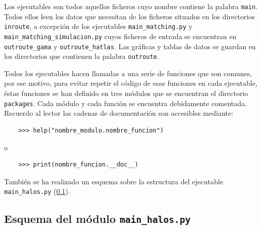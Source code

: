 \hspace{3mm}

Los ejecutables son todos aquellos ficheros cuyo nombre contiene la palabra \texttt{main}. Todos ellos leen los datos que necesitan de los ficheros situados en los directorios \texttt{inroute}, a excepción de los ejecutables \texttt{main\_matching.py} y \texttt{main\_matching\_simulacion.py} cuyos ficheros de entrada se encuentran en \texttt{outroute\_gama} y \texttt{outroute\_hatlas}. Las gráficas y tablas de datos se guardan en los directorios que contienen la palabra \texttt{outroute}. 

Todos los ejecutables hacen llamadas a una serie de funciones que son comunes, por ese motivo, para evitar repetir el código de esas funciones en cada ejecutable, éstas funciones se han definido en tres módulos que se encuentran el directorio \texttt{packages}. Cada módulo y cada función se encuentra debidamente comentada. Recuerdo al lector las cadenas de documentación son accesibles mediante:

\vspace{-2mm}

\begin{verbatim}
    >>> help("nombre_modulo.nombre_funcion")
\end{verbatim}

\vspace{-4mm}

o

\vspace{-4mm}

\begin{verbatim}
    >>> print(nombre_funcion.__doc__)
\end{verbatim}

\vspace{-2mm}

También se ha realizado un esquema sobre la estructura del ejecutable \texttt{main\_halos.py} (\ref{apendice:esquema_main_halos}). 

\let\thefootnote\relax{}

\newpage

\subsection{Esquema del módulo \texttt{main\_halos.py}}\label{apendice:esquema_main_halos}


